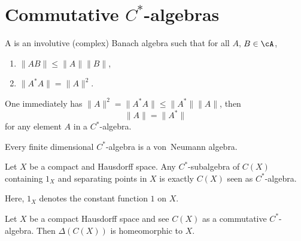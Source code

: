 \section{Commutative \texorpdfstring{$C^*$}{C}-algebras}

A  is an involutive (complex) Banach algebra such that for all $A$, $B\in\cA$,
\begin{enumerate}
\item $\|AB\|\leq\|A\|\|B\|$,
\item $\|A^*A\|=\|A\|^2$.
\end{enumerate}
One immediately has $\|A\|^2=\|A^*A\|\leq\|A^*\|\|A\|$, then
\begin{equation}
\|A\|=\|A^*\|
\end{equation}
for any element $A$ in a $C^*$-algebra.

\begin{lemma}       \label{LemFiniCSestVNa}
    Every finite dimensional $C^*$-algebra is a von~Neumann algebra.
\end{lemma}

\begin{lemma}
Let $X$ be a compact and Hausdorff space. Any $C^*$-subalgebra of $C(X)$ containing $1_X$ and separating points in $X$ is exactly $C(X)$ seen as $C^*$-algebra.
\end{lemma}\label{lem:Stone_W}
Here, $1_X$ denotes the constant function $1$ on $X$.

\begin{proposition}     \label{PropcomCstarDelCeqX}
Let $X$ be a compact Hausdorff space and see $C(X)$ as a commutative $C^*$-algebra. Then $\Delta(C(X))$ is homeomorphic to $X$.\label{prop:comHauffhomeo}
\end{proposition}

